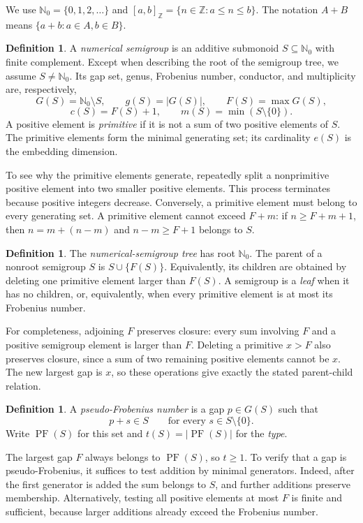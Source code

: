 \documentclass[11pt,letterpaper]{article}
\numberwithin{equation}{section}
\theoremstyle{definition}
\newtheorem{definition}[theorem]{Definition}
\theoremstyle{remark}
\newcommand{\N}{\mathbb N_0}
\newcommand{\Z}{\mathbb Z}
\newcommand{\ints}[2]{[#1,#2]_{\Z}}
\DeclareMathOperator{\PF}{PF}
\begin{document}
We use $\N=\{0,1,2,\ldots\}$ and
$\ints{a}{b}=\{n\in\Z:a\le n\le b\}$. The notation
$A+B$ means $\{a+b:a\in A,b\in B\}$.

\begin{definition}
A \emph{numerical semigroup} is an additive submonoid $S\subseteq\N$ with
finite complement. Except when describing the root of the semigroup tree,
we assume $S\ne\N$. Its gap set, genus, Frobenius number, conductor, and
multiplicity are, respectively,
\[
 G(S)=\N\setminus S,\qquad g(S)=|G(S)|,\qquad F(S)=\max G(S),
\]
\[
 c(S)=F(S)+1,\qquad m(S)=\min(S\setminus\{0\}).
\]
A positive element is \emph{primitive} if it is not a sum of two positive
elements of $S$. The primitive elements form the minimal generating set;
its cardinality $e(S)$ is the embedding dimension.
\end{definition}

To see why the primitive elements generate, repeatedly split a nonprimitive
positive element into two smaller positive elements. This process terminates
because positive integers decrease. Conversely, a primitive element must
belong to every generating set. A primitive element cannot exceed $F+m$:
if $n\ge F+m+1$, then $n=m+(n-m)$ and $n-m\ge F+1$ belongs to $S$.

\begin{definition}
The \emph{numerical-semigroup tree} has root $\N$. The parent of a nonroot
semigroup $S$ is $S\cup\{F(S)\}$. Equivalently, its children are obtained by
deleting one primitive element larger than $F(S)$. A semigroup is a
\emph{leaf} when it has no children, or, equivalently, when every primitive
element is at most its Frobenius number.
\end{definition}

For completeness, adjoining $F$ preserves closure: every sum involving $F$
and a positive semigroup element is larger than $F$. Deleting a primitive
$x>F$ also preserves closure, since a sum of two remaining positive elements
cannot be $x$. The new largest gap is $x$, so these operations give exactly
the stated parent-child relation.

\begin{definition}
A \emph{pseudo-Frobenius number} is a gap $p\in G(S)$ such that
\[
 p+s\in S\qquad\text{for every }s\in S\setminus\{0\}.
\]
Write $\PF(S)$ for this set and $t(S)=|\PF(S)|$ for the \emph{type}.
\end{definition}

The largest gap $F$ always belongs to $\PF(S)$, so $t\ge1$. To verify that a
gap is pseudo-Frobenius, it suffices to test addition by minimal generators.
Indeed, after the first generator is added the sum belongs to $S$, and
further additions preserve membership. Alternatively, testing all positive
elements at most $F$ is finite and sufficient, because larger additions
already exceed the Frobenius number.
\end{document}
